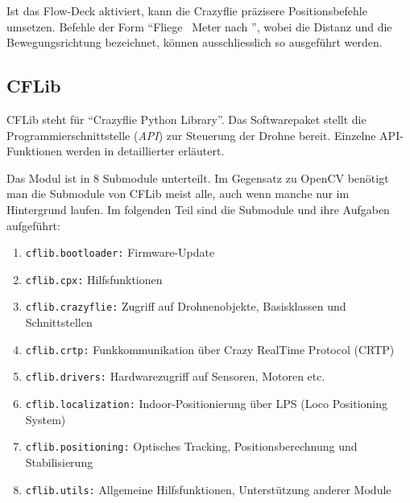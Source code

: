 Ist das Flow-Deck aktiviert, kann die Crazyflie präzisere Positionsbefehle umsetzen.
Befehle der Form \enquote{Fliege ~Meter nach }, wobei  die Distanz und  die Bewegungsrichtung bezeichnet, können ausschliesslich so ausgeführt werden.

\subsection{CFLib}
\label{sub:cflib}
CFLib steht für \enquote{Crazyflie Python Library}.
Das Softwarepaket stellt die Programmierschnittstelle (\textit{API}) zur Steuerung der Drohne bereit. 
Einzelne API-Funktionen werden in  detaillierter erläutert.

Das Modul ist in 8 Submodule unterteilt.
Im Gegensatz zu OpenCV benötigt man die Submodule von CFLib meist alle, auch wenn manche nur im Hintergrund laufen.
Im folgenden Teil sind die Submodule und ihre Aufgaben aufgeführt:

\begin{enumerate}
    \item \texttt{cflib.bootloader:} Firmware-Update
    \item \texttt{cflib.cpx:} Hilfsfunktionen
    \item \texttt{cflib.crazyflie:} Zugriff auf Drohnenobjekte, Basisklassen und Schnittstellen
    \item \texttt{cflib.crtp:} Funkkommunikation über Crazy RealTime Protocol (CRTP)
    \item \texttt{cflib.drivers:} Hardwarezugriff auf Sensoren, Motoren etc.
    \item \texttt{cflib.localization:} Indoor-Positionierung über LPS (Loco Positioning System)
    \item \texttt{cflib.positioning:} Optisches Tracking, Positionsberechnung und Stabilisierung
    \item \texttt{cflib.utils:} Allgemeine Hilfsfunktionen, Unterstützung anderer Module
\end{enumerate}

